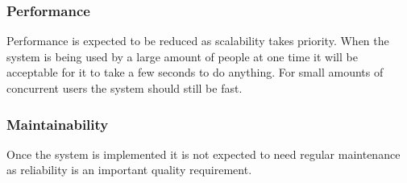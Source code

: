 \subsubsection{Performance}
Performance is expected to be reduced as scalability takes priority. When the system is being used by a large amount of people at one time it will be acceptable for it to take a few seconds to do anything. For small amounts of concurrent users the system should still be fast.\\

\subsubsection{Maintainability}
Once the system is implemented it is not expected to need regular maintenance as reliability is an important quality requirement.\\







